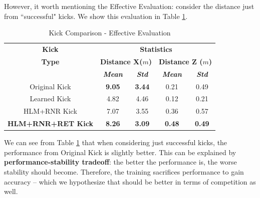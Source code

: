 However, it worth mentioning the Effective Evaluation: consider the distance just from ``successful" kicks. We show this evaluation in Table \ref{tab:finaltesteff}.

\begin{table}[!htbp]
	\caption{Kick Comparison - Effective Evaluation}
	\begin{center} 
		\begin{tabular}{|c|c|c|c|c|}
			\hline
			\textbf{Kick}&\multicolumn{4}{|c|}{\textbf{Statistics}} \\
			\cline{2-5} 
			\textbf{Type} &  \multicolumn{2}{|c|}{\textbf{Distance X(\(m\))}}& 
			\multicolumn{2}{|c|}{\textbf{Distance Z (\(m\))}}\\
			\cline {2-5} 
			& \textbf{\textit{Mean}}& \textbf{\textit{Std}}
			& \textbf{\textit{Mean}}& \textbf{\textit{Std}} \\
			\hline
			Original Kick  & \textbf{9.05} & \textbf{3.44} & 0.21 & 0.49 \\
			\hline
			Learned Kick  & 4.82 & 4.46 & 0.12 & 0.21 \\
			\hline
			HLM+RNR Kick & 7.07 & 3.55 & 0.36 & 0.57  \\
			\hline
			\textbf{HLM+RNR+RET Kick} & \textbf{8.26} & \textbf{3.09} & \textbf{0.48} & \textbf{0.49}  \\
			\hline
		\end{tabular}
		\label{tab:finaltesteff}
	\end{center}
\end{table}

We can see from Table \ref{tab:finaltesteff} that when considering just successful kicks, the performance from Original Kick is slightly better. This can be explained by \textbf{performance-stability tradeoff}: the better the performance is, the worse stability should become. Therefore, the training sacrifices performance to gain accuracy -- which we hypothesize that should be better in terms of competition as well.